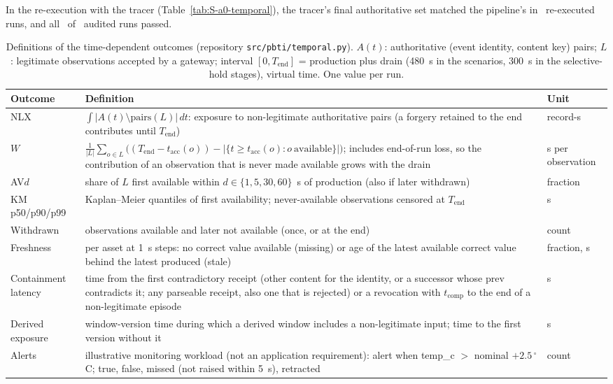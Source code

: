 \documentclass[10pt,a4paper]{article}
\begin{document}
\noindent In the re-execution with the tracer (Table~\ref{tab:S-a0-temporal}), the tracer's final authoritative set matched the pipeline's in \WAzeroTracerMatch\ re-executed runs, and all \WAzeroAuditsPass\ of \WAzeroAudits\ audited runs passed.
\begin{table}[!htbp]
\caption{Definitions of the time-dependent outcomes (repository \texttt{src/\allowbreak{}pbti/\allowbreak{}temporal.py}). $A(t)$: authoritative (event identity, content key) pairs; $L$: legitimate observations accepted by a gateway; interval $[0,T_\mathrm{end}]$ = production plus drain (480~s in the scenarios, 300~s in the selective-hold stages), virtual time. One value per run.\label{tab:S-tm-def}}
\footnotesize
\begin{tabularx}{\linewidth}{lXl}
\toprule
\textbf{Outcome} & \textbf{Definition} & \textbf{Unit}\\
\midrule
NLX & $\int |A(t)\setminus \mathrm{pairs}(L)|\,dt$: exposure to non-legitimate authoritative pairs (a forgery retained to the end contributes until $T_\mathrm{end}$) & record-s\\
$W$ & $\frac{1}{|L|}\sum_{o\in L}\big((T_\mathrm{end}-t_\mathrm{acc}(o)) - |\{t\ge t_\mathrm{acc}(o): o\ \mbox{available}\}|\big)$; includes end-of-run loss, so the contribution of an observation that is never made available grows with the drain & s per observation\\
AV$d$ & share of $L$ first available within $d\in\{1,5,30,60\}$~s of production (also if later withdrawn) & fraction\\
KM p50/p90/p99 & Kaplan--Meier quantiles of first availability; never-available observations censored at $T_\mathrm{end}$ & s\\
Withdrawn & observations available and later not available (once, or at the end) & count\\
Freshness & per asset at 1~s steps: no correct value available (missing) or age of the latest available correct value behind the latest produced (stale) & fraction, s\\
Containment latency & time from the first contradictory receipt (other content for the identity, or a successor whose \textsf{prev} contradicts it; any parseable receipt, also one that is rejected) or a revocation with $t_\mathrm{comp}$ to the end of a non-legitimate episode & s\\
Derived exposure & window-version time during which a derived window includes a non-legitimate input; time to the first version without it & s\\
Alerts & illustrative monitoring workload (not an application requirement): alert when temp\_c $>$ nominal $+2.5\,^\circ$C; true, false, missed (not raised within 5~s), retracted & count\\
\bottomrule
\end{tabularx}
\end{table}
\end{document}
